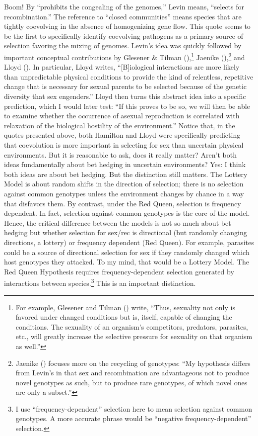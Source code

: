 \documentclass[
  letterpaper,
]{book}
\begin{document}
Boom! By ``prohibits the congealing of the genomes,'' Levin means,
``selects for recombination.'' The reference to ``closed communities''
means species that are tightly coevolving in the absence of homogenizing
gene flow. This quote seems to be the first to specifically identify
coevolving pathogens as a primary source of selection favoring the
mixing of genomes. Levin's idea was quickly followed by important
conceptual contributions by Glesener \& Tilman
(),\footnote{For example, Glesener and
  Tilman () write, ``Thus, sexuality
  not only is favored under changed conditions but is, itself, capable
  of changing the conditions. The sexuality of an organism's
  competitors, predators, parasites, etc., will greatly increase the
  selective pressure for sexuality on that organism as well.''} Jaenike
(),\footnote{Jaenike
  () focuses more on the recycling of
  genotypes: ``My hypothesis differs from Levin's in that sex and
  recombination are advantageous not to produce novel genotypes as such,
  but to produce rare genotypes, of which novel ones are only a
  subset.''} and Lloyd (). In particular,
Lloyd writes, ``{[}B{]}iological interactions are more likely than
unpredictable physical conditions to provide the kind of relentless,
repetitive change that is necessary for sexual parents to be selected
because of the genetic diversity that sex engenders.'' Lloyd then turns
this abstract idea into a specific prediction, which I would later test:
``If this proves to be so, we will then be able to examine whether the
occurrence of asexual reproduction is correlated with relaxation of the
biological hostility of the environment.'' Notice that, in the quotes
presented above, both Hamilton and Lloyd were specifically predicting
that coevolution is more important in selecting for sex than uncertain
physical environments. But it is reasonable to ask, does it really
matter? Aren't both ideas fundamentally about bet hedging in uncertain
environments? Yes: I think both ideas are about bet hedging. But the
distinction still matters. The Lottery Model is about random shifts in
the direction of selection; there is no selection against common
genotypes unless the environment changes by chance in a way that
disfavors them. By contrast, under the Red Queen, selection is frequency
dependent. In fact, selection against common genotypes is the core of
the model. Hence, the critical difference between the models is not so
much about bet hedging but whether selection for sex/rec is directional
(but randomly changing directions, a lottery) or frequency dependent
(Red Queen). For example, parasites could be a source of directional
selection for sex if they randomly changed which host genotypes they
attacked. To my mind, that would be a Lottery Model. The Red Queen
Hypothesis requires frequency-dependent selection generated by
interactions between species.\footnote{I use ``frequency-dependent''
  selection here to mean selection against common genotypes. A more
  accurate phrase would be ``negative frequency-dependent'' selection.}
This is an important distinction.
\end{document}
